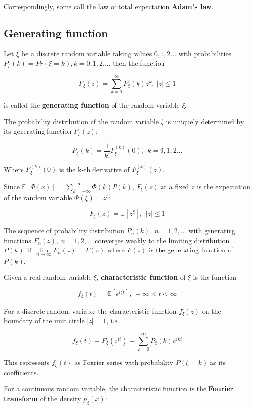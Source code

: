 \documentclass{article}
\begin{document}
Correspondingly, some call the law of total expectation \textbf{Adam's law}.

\subsection{Generating function}

Let $\xi$ be a discrete random variable taking values $0, 1, 2 \dots$ with probabilities $P_{\xi}(k) = Pr(\xi = k), k = 0, 1, 2\dots$, then the function

$$
F_{\xi}(z) = \sum_{k = 0}^{\infty} P_{\xi}(k) z^k, ~ |z| \leq 1
$$

is called the \textbf{generating function} of the random variable $\xi$.

The probability distribution of the random variable $\xi$ is uniquely determined by its generating function $F_{\xi}(z)$:

$$
P_{\xi}(k) = \frac{1}{k!} F_{\xi}^{(k)}(0), ~ ~ k = 0, 1, 2 \dots
$$

Where $F_{\xi}^{(k)}(0)$ is the k-th derivative of $F_{\xi}^{(k)}(z)$.

Since $\mathbb{E}[\Phi(x)] = \sum_{k = -\infty}^{+\infty} \Phi(k) P(k)$, $F_{\xi}(z)$ at a fixed $z$ is the expectation of the random variable $\Phi(\xi) = z^{\xi}$:

$$
F_{\xi}(z) = \mathbb{E}[z^{\xi}], ~ ~ |z| \leq 1
$$

The sequence of probability distribution $P_n(k), ~n = 1, 2, \dots$ with generating functions $F_n(z), ~ n = 1, 2, \dots$ converges weakly to the limiting distribution $P(k)$ iff $\lim\limits_{n \to \infty} F_n(z) = F(z)$ where $F(z)$ is the generating function of $P(k)$.

Given a real random variable $\xi$, \textbf{characteristic function} of $\xi$ is the function

$$
f_{\xi}(t) = \mathbb{E}[e^{i \xi t}], ~ -\infty < t < \infty
$$

For a discrete random variable the characteristic function $f_{\xi}(z)$ on the boundary of the unit circle $|z| = 1$, i.e.

$$
f_{\xi}(t) = F_{\xi}(e^{it}) = \sum_{k = 0}^{\infty}{ P_{\xi}(k) e^{ikt} }
$$

This represents $f_{\xi}(t)$ as Fourier series with probability $P(\xi = k)$ as its coefficients.

For a continuous random variable, the characteristic function is the \textbf{Fourier transform} of the density $p_{\xi}(x)$:
\end{document}
